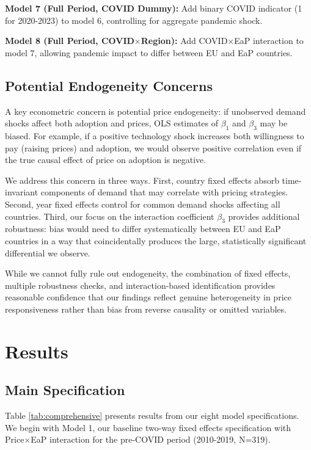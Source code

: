 \documentclass[12pt,review]{elsarticle}
\begin{document}
\textbf{Model 7 (Full Period, COVID Dummy):} Add binary COVID indicator (1 for 2020-2023) to model 6, controlling for aggregate pandemic shock.

\textbf{Model 8 (Full Period, COVID$\times$Region):} Add COVID$\times$EaP interaction to model 7, allowing pandemic impact to differ between EU and EaP countries.

\subsection{Potential Endogeneity Concerns}

A key econometric concern is potential price endogeneity: if unobserved demand shocks affect both adoption and prices, OLS estimates of $\beta_1$ and $\beta_3$ may be biased. For example, if a positive technology shock increases both willingness to pay (raising prices) and adoption, we would observe positive correlation even if the true causal effect of price on adoption is negative.

We address this concern in three ways. First, country fixed effects absorb time-invariant components of demand that may correlate with pricing strategies. Second, year fixed effects control for common demand shocks affecting all countries. Third, our focus on the interaction coefficient $\beta_3$ provides additional robustness: bias would need to differ systematically between EU and EaP countries in a way that coincidentally produces the large, statistically significant differential we observe.

While we cannot fully rule out endogeneity, the combination of fixed effects, multiple robustness checks, and interaction-based identification provides reasonable confidence that our findings reflect genuine heterogeneity in price responsiveness rather than bias from reverse causality or omitted variables.

\section{Results}
\label{sec:results}

\subsection{Main Specification}

Table \ref{tab:comprehensive} presents results from our eight model specifications. We begin with Model 1, our baseline two-way fixed effects specification with Price$\times$EaP interaction for the pre-COVID period (2010-2019, N=319).
\end{document}
